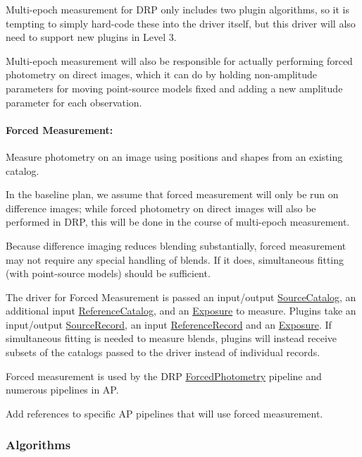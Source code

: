 Multi-epoch measurement for DRP only includes two plugin algorithms, so it is tempting to simply hard-code these into the driver itself, but this driver will also need to support new plugins in Level 3.

Multi-epoch measurement will also be responsible for actually performing forced photometry on direct images, which it can do by holding non-amplitude parameters for moving point-source models fixed and adding a new amplitude parameter for each observation.

\paragraph{Forced Measurement:} Measure photometry on an image using positions and shapes from an existing catalog.
\label{sec:acForcedMeasurement}

In the baseline plan, we assume that forced measurement will only be run on difference images; while forced photometry on direct images will also be performed in DRP, this will be done in the course of multi-epoch measurement.

Because difference imaging reduces blending substantially, forced measurement may not require any special handling of blends.  If it does, simultaneous fitting (with point-source models) should be sufficient.

The driver for Forced Measurement is passed an input/output \hyperref[sec:spTablesSource]{SourceCatalog}, an additional input \hyperref[sec:spTablesReference]{ReferenceCatalog}, and an \hyperref[sec:spImagesExposure]{Exposure} to measure.  Plugins take an input/output \hyperref[sec:spTablesSource]{SourceRecord}, an input \hyperref[sec:spTablesReference]{ReferenceRecord} and an \hyperref[sec:spImagesExposure]{Exposure}.  If simultaneous fitting is needed to measure blends, plugins will instead receive subsets of the catalogs passed to the driver instead of individual records.

Forced measurement is used by the DRP \hyperref[sec:drpForcedPhotometry]{ForcedPhotometry} pipeline and numerous pipelines in AP.

\begin{note}[TODO]
Add references to specific AP pipelines that will use forced measurement.
\end{note}

\subsubsection{Algorithms}
\label{sec:acMeasurementAlgorithms}
